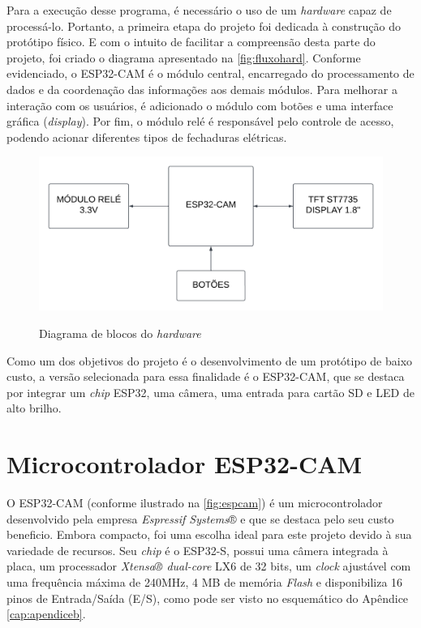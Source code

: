 Para a execução desse programa, é necessário o uso de um \textit{hardware}
capaz de processá-lo. Portanto, a primeira etapa do projeto foi dedicada à
construção do protótipo físico. E com o intuito de facilitar a compreensão desta
parte do projeto, foi criado o diagrama apresentado na \autoref{fig:fluxohard}.
Conforme evidenciado, o ESP32-CAM é o módulo central, encarregado do
processamento de dados e da coordenação das informações aos demais módulos.
Para melhorar a interação com os usuários, é adicionado o módulo com botões e
uma interface gráfica (\textit{display}). Por fim, o módulo relé é
responsável pelo controle de acesso, podendo acionar diferentes tipos de
fechaduras elétricas.

\begin{figure}[h!]
    \centering
    \caption{Diagrama de blocos do \textit{hardware}}
    \includegraphics[scale=0.22]{figuras/diagrama_hardware.png}
    \fonte{}%
    \label{fig:fluxohard}
    \centering
\end{figure}

Como um dos objetivos do projeto é o desenvolvimento de um protótipo de
baixo custo, a versão selecionada para essa finalidade é o ESP32-CAM,
que se destaca por integrar um \textit{chip} ESP32, uma câmera, uma
entrada para cartão SD e LED de alto brilho.

\section{Microcontrolador ESP32-CAM}\label{sec:materiais}

O ESP32-CAM (conforme ilustrado na \autoref{fig:espcam}) é um
microcontrolador desenvolvido pela empresa
\textit{Espressif Systems}® e que se destaca pelo seu custo beneficio.
Embora compacto, foi uma escolha ideal para este projeto devido à sua
variedade de recursos. Seu \textit{chip} é o ESP32-S, possui uma câmera integrada 
à placa, um processador \textit{Xtensa® dual-core} LX6 de 32 bits, um \textit{clock} 
ajustável com uma frequência máxima de 240MHz, 4 MB de memória 
\textit{Flash} e disponibiliza 16 pinos de Entrada/Saída (E/S), como 
pode ser visto no esquemático do Apêndice \ref{cap:apendiceb}.

